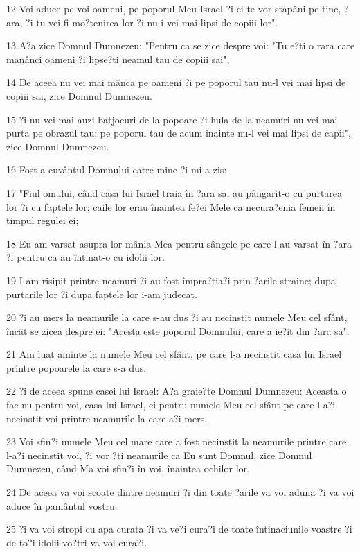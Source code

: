 \par 12 Voi aduce pe voi oameni, pe poporul Meu Israel ?i ei te vor stapâni pe tine, ?ara, ?i tu vei fi mo?tenirea lor ?i nu-i vei mai lipsi de copiii lor".
\par 13 A?a zice Domnul Dumnezeu: "Pentru ca se zice despre voi: "Tu e?ti o rara care manânci oameni ?i lipse?ti neamul tau de copiii sai",
\par 14 De aceea nu vei mai mânca pe oameni ?i pe poporul tau nu-l vei mai lipsi de copiii sai, zice Domnul Dumnezeu.
\par 15 ?i nu vei mai auzi batjocuri de la popoare ?i hula de la neamuri nu vei mai purta pe obrazul tau; pe poporul tau de acum înainte nu-l vei mai lipsi de capii", zice Domnul Dumnezeu.
\par 16 Fost-a cuvântul Domnului catre mine ?i mi-a zis:
\par 17 "Fiul omului, când casa lui Israel traia în ?ara sa, au pângarit-o cu purtarea lor ?i cu faptele lor; caile lor erau înaintea fe?ei Mele ca necura?enia femeii în timpul regulei ei;
\par 18 Eu am varsat asupra lor mânia Mea pentru sângele pe care l-au varsat în ?ara ?i pentru ca au întinat-o cu idolii lor.
\par 19 I-am risipit printre neamuri ?i au fost împra?tia?i prin ?arile straine; dupa purtarile lor ?i dupa faptele lor i-am judecat.
\par 20 ?i au mers la neamurile la care s-au dus ?i au necinstit numele Meu cel sfânt, încât se zicea despre ei: "Acesta este poporul Domnului, care a ie?it din ?ara sa".
\par 21 Am luat aminte la numele Meu cel sfânt, pe care l-a necinstit casa lui Israel printre popoarele la care s-a dus.
\par 22 ?i de aceea spune casei lui Israel: A?a graie?te Domnul Dumnezeu: Aceasta o fac nu pentru voi, casa lui Israel, ci pentru numele Meu cel sfânt pe care l-a?i necinstit voi printre neamurile la care a?i mers.
\par 23 Voi sfin?i numele Meu cel mare care a fost necinstit la neamurile printre care l-a?i necinstit voi, ?i vor ?ti neamurile ca Eu sunt Domnul, zice Domnul Dumnezeu, când Ma voi sfin?i în voi, înaintea ochilor lor.
\par 24 De aceea va voi scoate dintre neamuri ?i din toate ?arile va voi aduna ?i va voi aduce în pamântul vostru.
\par 25 ?i va voi stropi cu apa curata ?i va ve?i cura?i de toate întinaciunile voastre ?i de to?i idolii vo?tri va voi cura?i.
